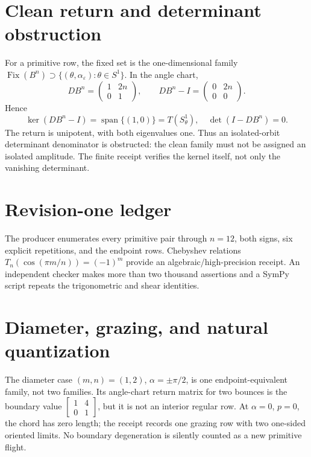 \documentclass[10pt]{article}
\begin{document}
\section{Clean return and determinant obstruction}
For a primitive row, the fixed set is the one-dimensional family
\(\operatorname{Fix}(B^n)\supset\{(\theta,\alpha_\varepsilon):\theta\in S^1\}\).
In the angle chart,
\begin{equation}
 DB^n=\begin{pmatrix}1&2n\\0&1\end{pmatrix},\qquad
 DB^n-I=\begin{pmatrix}0&2n\\0&0\end{pmatrix}.         \label{eq:shear}
\end{equation}
Hence
\begin{equation}
 \ker(DB^n-I)=\operatorname{span}\{(1,0)\}=T(S^1_\theta),\quad
 \det(I-DB^n)=0.                                      \label{eq:kernel}
\end{equation}
The return is unipotent, with both eigenvalues one.  Thus an isolated-orbit
determinant denominator is obstructed: the clean family must not be assigned
an isolated amplitude.  The finite receipt verifies the kernel itself, not
only the vanishing determinant.

\ifnum{}
\section{Revision-one ledger}
The producer enumerates every primitive pair through \(n=12\), both signs,
six explicit repetitions, and the endpoint rows.  Chebyshev relations
\(T_n(\cos(\pi m/n))=(-1)^m\) provide an algebraic/high-precision receipt.
An independent checker makes more than two thousand assertions and a SymPy
script repeats the trigonometric and shear identities.
\fi

\section{Diameter, grazing, and natural quantization}
The diameter case \((m,n)=(1,2)\), \(\alpha=\pm\pi/2\), is one
endpoint-equivalent family, not two families.  Its angle-chart return matrix
for two bounces is the boundary value
\(\left[\begin{smallmatrix}1&4\\0&1\end{smallmatrix}\right]\), but it is not an
interior regular row.  At \(\alpha=0\), \(p=0\), the chord has zero length;
the receipt records one grazing row with two one-sided oriented limits.  No
boundary degeneration is silently counted as a new primitive flight.
\end{document}
